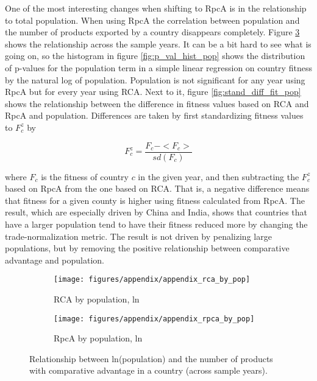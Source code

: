 \documentclass[11pt]{article}
\begin{document}
\begin{appendices}
One of the most interesting changes when shifting to RpcA is in the relationship to total population. When using RpcA the correlation between population and the number of products exported by a country disappears completely. Figure \ref{fig:rca_rpca_by_pop} shows the relationship across the sample years. It can be a bit hard to see what is going on, so the histogram in figure \ref{fig:p_val_hist_pop} shows the distribution of p-values for the population term in a simple linear regression on country fitness by the natural log of population. Population is not significant for any year using RpcA but for every year using RCA. Next to it, figure \ref{fig:stand_diff_fit_pop} shows the relationship between the difference in fitness values based on RCA and RpcA and population. Differences are taken by first standardizing fitness values to \(F^{z}_{c}\) by

\[
 F^{z}_{c} = \frac{F_{c} - <F_{c}>}{sd(F_{c})}
\]

where \(F_{c}\) is the fitness of country \(c\) in the given year, and then subtracting the \(F^{z}_{c}\) based on RpcA from the one based on RCA. That is, a negative difference means that fitness for a given county is higher using fitness calculated from RpcA. The result, which are especially driven by China and India, shows that countries that have a larger population tend to have their fitness reduced more by changing the trade-normalization metric. The result is not driven by penalizing large populations, but by removing the positive relationship between comparative advantage and population.

\begin{figure}
     \centering
     \begin{subfigure}[b]{0.45\textwidth}
         \centering
         \texttt{[image: figures/appendix/appendix\_rca\_by\_pop]}
         \caption{RCA by population, ln}
         \label{fig:rca_by_pop}
     \end{subfigure}
     \hfill
     \begin{subfigure}[b]{0.45\textwidth}
         \centering
         \texttt{[image: figures/appendix/appendix\_rpca\_by\_pop]}
         \caption{RpcA by population, ln}
         \label{fig:rpca_by_pop}
     \end{subfigure}
	 \caption{Relationship between ln(population) and the number of products
	   with comparative advantage in a country (across sample years).}
        \label{fig:rca_rpca_by_pop}
\end{figure}


\end{appendices}
\end{document}

